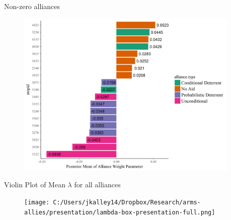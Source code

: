\documentclass{beamer}
\begin{document}

\begin{frame}{Non-zero alliances}

\begin{figure}
	\centering
		\includegraphics[width=0.95\textwidth]{non-zero alliances.png}
	\label{fig:non-zero alliances}
\end{figure}


\end{frame}


\begin{frame}{Violin Plot of Mean $\lambda$ for all alliances}

\begin{figure}
	\centering
		\texttt{[image: C:/Users/jkalley14/Dropbox/Research/arms-allies/presentation/lambda-box-presentation-full.png]}
	\label{fig:lambda-box-presentation-full}
\end{figure}


\end{frame}


\end{document}
